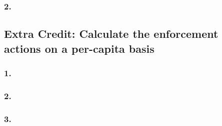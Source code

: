 \documentclass[
  letterpaper,
  DIV=11,
  numbers=noendperiod]{scrartcl}
\begin{document}
\subsubsection{2.}\label{section-6}

\subsection{Extra Credit: Calculate the enforcement actions on a
per-capita
basis}\label{extra-credit-calculate-the-enforcement-actions-on-a-per-capita-basis}

\subsubsection{1.}\label{section-7}

\subsubsection{2.}\label{section-8}

\subsubsection{3.}\label{section-9}
\end{document}
